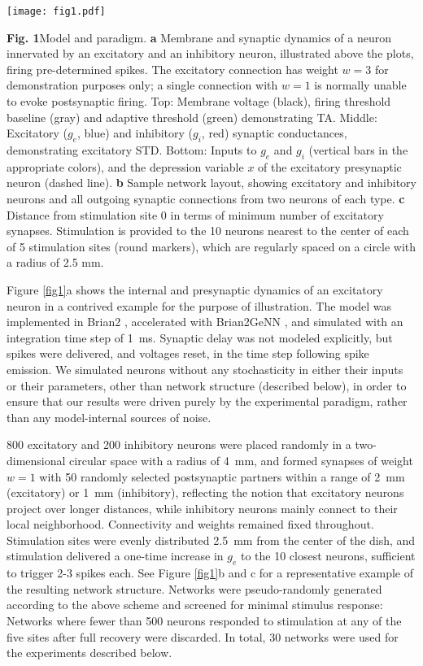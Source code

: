 \documentclass[pdflatex,referee,iicol,sn-basic]{sn-jnl}
\theoremstyle{thmstyleone}%
\theoremstyle{thmstyletwo}%
\theoremstyle{thmstylethree}%
\begin{document}
\begin{figure*}%
    \centering
    \texttt{[image: fig1.pdf]}
    \caption{}
    \label{fig1}
\end{figure*}
\textbf{Fig. 1}Model and paradigm. \textbf{a} Membrane and synaptic dynamics of a neuron innervated by an excitatory and an inhibitory neuron, illustrated above the plots, firing pre-determined spikes. The excitatory connection has weight $w = 3$ for demonstration purposes only; a single connection with $w = 1$ is normally unable to evoke postsynaptic firing. Top: Membrane voltage (black), firing threshold baseline (gray) and adaptive threshold (green) demonstrating TA. Middle: Excitatory ($g_e$, blue) and inhibitory ($g_i$, red) synaptic conductances, demonstrating excitatory STD. Bottom: Inputs to $g_e$ and $g_i$ (vertical bars in the appropriate colors), and the depression variable $x$ of the excitatory presynaptic neuron (dashed line). \textbf{b} Sample network layout, showing excitatory and inhibitory neurons and all outgoing synaptic connections from two neurons of each type. \textbf{c} Distance from stimulation site 0 in terms of minimum number of excitatory synapses. Stimulation is provided to the 10 neurons nearest to the center of each of 5 stimulation sites (round markers), which are regularly spaced on a circle with a radius of 2.5 mm.

Figure \ref{fig1}a shows the internal and presynaptic dynamics of an excitatory neuron in a contrived example for the purpose of illustration. The model was implemented in Brian2 \citep{Stimberg2019-tc}, accelerated with Brian2GeNN \citep{Stimberg2020-go}, and simulated with an integration time step of 1~ms. Synaptic delay was not modeled explicitly, but spikes were delivered, and voltages reset, in the time step following spike emission. We simulated neurons without any stochasticity in either their inputs or their parameters, other than network structure (described below), in order to ensure that our results were driven purely by the experimental paradigm, rather than any model-internal sources of noise.

800 excitatory and 200 inhibitory neurons were placed randomly in a two-dimensional circular space with a radius of 4~mm, and formed synapses of weight $w=1$ with 50 randomly selected postsynaptic partners within a range of 2~mm (excitatory) or 1~mm (inhibitory), reflecting the notion that excitatory neurons project over longer distances, while inhibitory neurons mainly connect to their local neighborhood. Connectivity and weights remained fixed throughout. Stimulation sites were evenly distributed 2.5~mm from the center of the dish, and stimulation delivered a one-time increase in $g_e$ to the 10 closest neurons, sufficient to trigger 2-3 spikes each. See Figure \ref{fig1}b and c for a representative example of the resulting network structure. Networks were pseudo-randomly generated according to the above scheme and screened for minimal stimulus response: Networks where fewer than 500 neurons responded to stimulation at any of the five sites after full recovery were discarded. In total, 30 networks were used for the experiments described below.
\end{document}
